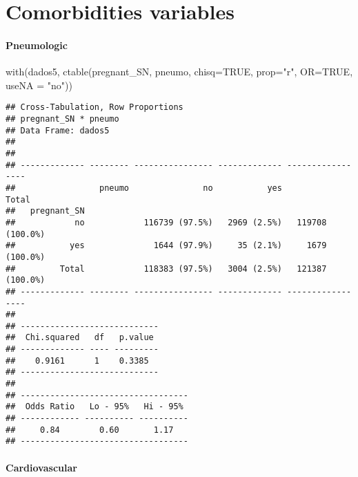 \documentclass[
]{article}
\newenvironment{Shaded}{\begin{snugshade}}{\end{snugshade}}
\newcommand{\AttributeTok}[1]{\textcolor[rgb]{0.77,0.63,0.00}{#1}}
\newcommand{\ConstantTok}[1]{\textcolor[rgb]{0.00,0.00,0.00}{#1}}
\newcommand{\FunctionTok}[1]{\textcolor[rgb]{0.00,0.00,0.00}{#1}}
\newcommand{\NormalTok}[1]{#1}
\newcommand{\StringTok}[1]{\textcolor[rgb]{0.31,0.60,0.02}{#1}}
\begin{document}
\hypertarget{comorbidities-variables}{%
\section{Comorbidities variables}\label{comorbidities-variables}}

\hypertarget{pneumologic}{%
\paragraph{\texorpdfstring{{ Pneumologic
}}{ Pneumologic }}\label{pneumologic}}

\begin{Shaded}
\begin{Highlighting}[]
\FunctionTok{with}\NormalTok{(dados5, }\FunctionTok{ctable}\NormalTok{(pregnant\_SN, pneumo, }\AttributeTok{chisq=}\ConstantTok{TRUE}\NormalTok{, }\AttributeTok{prop=}\StringTok{"r"}\NormalTok{, }\AttributeTok{OR=}\ConstantTok{TRUE}\NormalTok{, }\AttributeTok{useNA =} \StringTok{"no"}\NormalTok{))}
\end{Highlighting}
\end{Shaded}

\begin{verbatim}
## Cross-Tabulation, Row Proportions  
## pregnant_SN * pneumo  
## Data Frame: dados5  
## 
## 
## ------------- -------- ---------------- ------------- -----------------
##                 pneumo               no           yes             Total
##   pregnant_SN                                                          
##            no            116739 (97.5%)   2969 (2.5%)   119708 (100.0%)
##           yes              1644 (97.9%)     35 (2.1%)     1679 (100.0%)
##         Total            118383 (97.5%)   3004 (2.5%)   121387 (100.0%)
## ------------- -------- ---------------- ------------- -----------------
## 
## ----------------------------
##  Chi.squared   df   p.value 
## ------------- ---- ---------
##    0.9161      1    0.3385  
## ----------------------------
## 
## ----------------------------------
##  Odds Ratio   Lo - 95%   Hi - 95% 
## ------------ ---------- ----------
##     0.84        0.60       1.17   
## ----------------------------------
\end{verbatim}

\hypertarget{cardiovascular}{%
\paragraph{\texorpdfstring{{ Cardiovascular
}}{ Cardiovascular }}\label{cardiovascular}}
\end{document}

